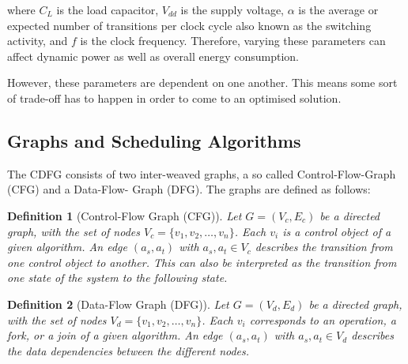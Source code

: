 \documentclass[conference]{IEEEtran}
\newtheorem{definition}{Definition}
\begin{document}
where $C_L$ is the load capacitor, $V_{dd}$ is the supply voltage, $α$ is the average or expected number of transitions per clock cycle also known as the switching activity, and $f$ is the clock frequency. Therefore, varying these parameters can affect dynamic power as well as overall energy consumption. 

However, these parameters are dependent on one another. This means some sort of trade-off has to happen in order to come to an optimised solution. 



\subsection{Graphs and Scheduling Algorithms}
\label{subsec: graphs}
The CDFG consists of two inter-weaved graphs, a so called Control-Flow-Graph (CFG) and a Data-Flow-
Graph (DFG). The graphs are defined as follows:
\begin{definition}[Control-Flow Graph (CFG)]
\label{def:cfg}
Let $G = (V_c, E_c)$ be a directed graph, with the set of nodes $V_c = \{v_1, v_2, \ldots, v_n\}$. Each $v_i$ is a control object of a given algorithm. An edge $(a_s, a_t)$ with $a_s, a_t \in V_c$ describes the transition from one control object to another. This can also be interpreted as the transition from one state of the system to the following state.
\end{definition}

\begin{definition}[Data-Flow Graph (DFG)]
\label{def:dfg}
Let $G = (V_d, E_d)$ be a directed graph, with the set of nodes $V_d = \{v_1, v_2, \ldots, v_n\}$. Each $v_i$ corresponds to an operation, a fork, or a join of a given algorithm. An edge $(a_s, a_t)$ with $a_s, a_t \in V_d$ describes the data dependencies between the different nodes.
\end{definition}
\end{document}
